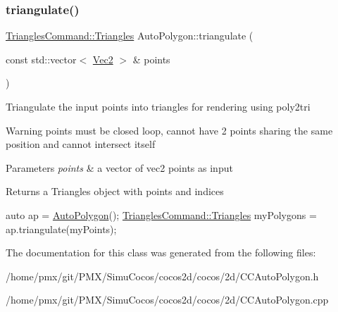 \subsubsection{\texorpdfstring{triangulate()}{triangulate()}}
{\footnotesize\ttfamily \hyperlink{structTrianglesCommand_1_1Triangles}{Triangles\+Command\+::\+Triangles} Auto\+Polygon\+::triangulate (\begin{DoxyParamCaption}\item[{const std\+::vector$<$ \hyperlink{classVec2}{Vec2} $>$ \&}]{points }\end{DoxyParamCaption})}

Triangulate the input points into triangles for rendering using poly2tri \begin{DoxyWarning}{Warning}
points must be closed loop, cannot have 2 points sharing the same position and cannot intersect itself 
\end{DoxyWarning}

\begin{DoxyParams}{Parameters}
{\em points} & a vector of vec2 points as input \\
\hline
\end{DoxyParams}
\begin{DoxyReturn}{Returns}
a Triangles object with points and indices 
\begin{DoxyCode}
\textcolor{keyword}{auto} ap = \hyperlink{group____2d_gaa74351ac8f735344958e7b2ac8363bb5}{AutoPolygon}();
\hyperlink{structTrianglesCommand_1_1Triangles}{TrianglesCommand::Triangles} myPolygons = ap.triangulate(myPoints);
\end{DoxyCode}
 
\end{DoxyReturn}


The documentation for this class was generated from the following files\+:\begin{DoxyCompactItemize}
\item 
/home/pmx/git/\+P\+M\+X/\+Simu\+Cocos/cocos2d/cocos/2d/C\+C\+Auto\+Polygon.\+h\item 
/home/pmx/git/\+P\+M\+X/\+Simu\+Cocos/cocos2d/cocos/2d/C\+C\+Auto\+Polygon.\+cpp\end{DoxyCompactItemize}
